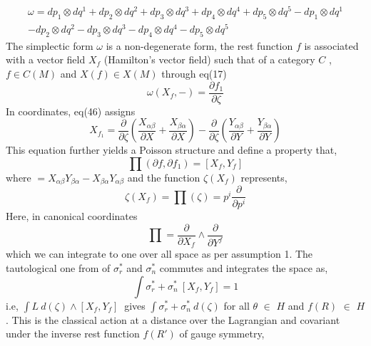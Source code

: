 \documentclass{article}
\begin{document}
    \begin{multline}
        \omega = dp_1 \otimes dq^1 + dp_2 \otimes dq^2 + dp_3 \otimes dq^3 + dp_4 \otimes dq^4 + dp_5 \otimes dq^5 - dp_1 \otimes dq^1 \\ - dp_2 \otimes dq^2  - dp_3 \otimes dq^3 - dp_4 \otimes dq^4 - dp_5 \otimes dq^5 
    \end{multline}
  The simplectic form $\omega$ is a non-degenerate form, the rest function $f$ is associated with a vector field  $X_f$ (Hamilton's vector field) such that of a category $C$ , \begin{math}
 f \in C(M) 
  \end{math} and \begin{math}
   X(f) \in X(M) 
  \end{math} through eq(17) \begin{equation}
      \omega (X_f, -) = \frac{\partial f_1}{\partial \zeta} 
  \end{equation} In coordinates, eq(46) assigns \begin{equation}
      X_{f_1} = \frac{\partial}{\partial \zeta} ( \frac{X_{\alpha \beta}}{\partial X} + \frac{X_{\beta \alpha}}{\partial X} ) -\frac{\partial}{\partial \zeta} ( \frac{Y_{\alpha \beta}}{\partial Y} + \frac{Y_{\beta \alpha}}{\partial Y} ) 
  \end{equation} This equation further yields a Poisson structure and define a property that, 
  \begin{equation}
     \prod (\partial f, \partial f_1 ) = [X_f , Y_{f}] 
  \end{equation}
  where \begin{math}
   [X,Y] = X_{\alpha \beta} Y_{\beta \alpha} -  X_{\beta \alpha} Y_{\alpha \beta} 
  \end{math} and the function $\zeta (X_f)$ represents,
  \begin{equation}
      \zeta(X_f) = \prod (\zeta) = p^i \frac{\partial}{\partial p^i}
  \end{equation} Here, in canonical coordinates \begin{equation}
 \prod = \frac{\partial}{\partial X_f} \wedge \frac{\partial}{\partial Y^f} 
  \end{equation} which we can integrate to one over all space as per assumption 1. The tautological one from of $\sigma_r^*$ and $\sigma_n^* $ commutes and integrates the space as,
  \begin{equation}
      \int  \sigma_r^* + \sigma_n^* \ [X_f , Y_f] = 1 
  \end{equation} i.e, \begin{math}
  \int L \ d(\zeta) \wedge [X_f , Y_f] \
  \end{math} gives \begin{math}
  \int \sigma_r^* + \sigma_n^* \ d(\zeta)
  \end{math} for all $\theta$ $\in$ $H$ and $f(R)$ $\in$ $H$. This is the classical action at a distance over the Lagrangian and covariant under the inverse rest function $f(R')$ of gauge symmetry,
\end{document}
